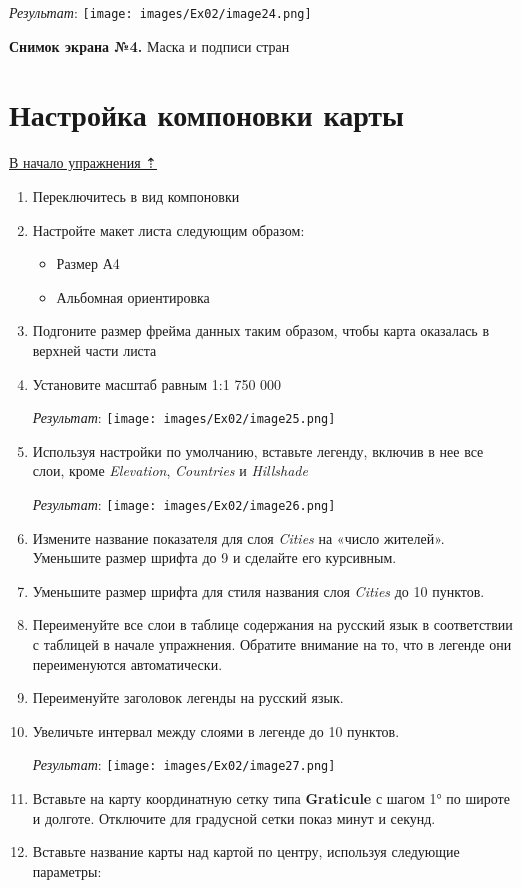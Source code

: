 \documentclass[12pt,]{book}
\providecommand{\tightlist}{%
  \setlength{\itemsep}{0pt}\setlength{\parskip}{0pt}}
\begin{document}
\emph{Результат}:
\texttt{[image: images/Ex02/image24.png]}

\textbf{Снимок экрана №4.} Маска и подписи стран

\hypertarget{map-design-general-layout}{%
\section{Настройка компоновки карты}\label{map-design-general-layout}}

\protect\hyperlink{map-design-general}{В начало упражнения ⇡}

\begin{enumerate}
\def\labelenumi{\arabic{enumi}.}
\item
  Переключитесь в вид компоновки
\item
  Настройте макет листа следующим образом:

  \begin{itemize}
  \tightlist
  \item
    Размер А4
  \item
    Альбомная ориентировка
  \end{itemize}
\item
  Подгоните размер фрейма данных таким образом, чтобы карта оказалась в верхней части листа
\item
  Установите масштаб равным 1:1 750 000

  \emph{Результат}:
  \texttt{[image: images/Ex02/image25.png]}
\item
  Используя настройки по умолчанию, вставьте легенду, включив в нее все слои, кроме \emph{Elevation}, \emph{Countries} и \emph{Hillshade}

  \emph{Результат}:
  \texttt{[image: images/Ex02/image26.png]}
\item
  Измените название показателя для слоя \emph{Cities} на «число жителей». Уменьшите размер шрифта до 9 и сделайте его курсивным.
\item
  Уменьшите размер шрифта для стиля названия слоя \emph{Cities} до 10 пунктов.
\item
  Переименуйте все слои в таблице содержания на русский язык в соответствии с таблицей в начале упражнения. Обратите внимание на то, что в легенде они переименуются автоматически.
\item
  Переименуйте заголовок легенды на русский язык.
\item
  Увеличьте интервал между слоями в легенде до 10 пунктов.

  \emph{Результат}:
  \texttt{[image: images/Ex02/image27.png]}
\item
  Вставьте на карту координатную сетку типа \textbf{Graticule} с шагом 1° по широте и долготе. Отключите для градусной сетки показ минут и секунд.
\item
  Вставьте название карты над картой по центру, используя следующие параметры:


\end{enumerate}
\end{document}
